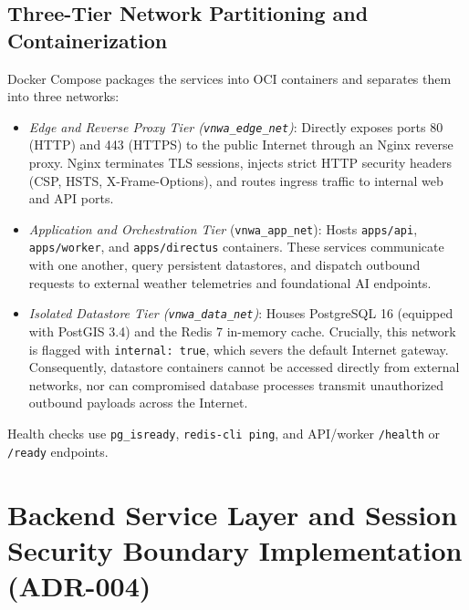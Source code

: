 \subsection{Three-Tier Network Partitioning and Containerization}
Docker Compose packages the services into OCI containers and separates them into three networks:
\begin{itemize}
    \item[-] \textit{Edge and Reverse Proxy Tier (\texttt{vnwa\_edge\_net})}: Directly exposes ports 80 (HTTP) and 443 (HTTPS) to the public Internet through an Nginx reverse proxy. Nginx terminates TLS sessions, injects strict HTTP security headers (CSP, HSTS, X-Frame-Options), and routes ingress traffic to internal web and API ports.
    \item[-] \textit{Application and Orchestration Tier} (\texttt{vnwa\_}\allowbreak\texttt{app\_}\allowbreak\texttt{net}): Hosts \texttt{apps/api}, \texttt{apps/worker}, and \texttt{apps/directus} containers. These services communicate with one another, query persistent datastores, and dispatch outbound requests to external weather telemetries and foundational AI endpoints.
    \item[-] \textit{Isolated Datastore Tier (\texttt{vnwa\_data\_net})}: Houses PostgreSQL 16 (equipped with PostGIS 3.4) and the Redis 7 in-memory cache. Crucially, this network is flagged with \texttt{internal: true}, which severs the default Internet gateway. Consequently, datastore containers cannot be accessed directly from external networks, nor can compromised database processes transmit unauthorized outbound payloads across the Internet.
\end{itemize}

Health checks use \texttt{pg\_isready}, \texttt{redis-cli ping}, and API/worker \texttt{/health} or \texttt{/ready} endpoints.

\section{Backend Service Layer and Session Security Boundary Implementation (ADR-004)}
\label{sec:backend_fastify_impl}

